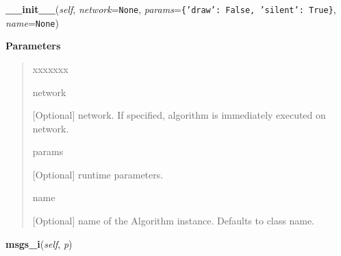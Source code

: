 \hspace{.8\funcindent}\begin{boxedminipage}{\funcwidth}

    \raggedright \textbf{\_\_init\_\_}(\textit{self}, \textit{network}={\tt None}, \textit{params}={\tt \texttt{\{}\texttt{'}\texttt{draw}\texttt{'}\texttt{: }False\texttt{, }\texttt{'}\texttt{silent}\texttt{'}\texttt{: }True\texttt{\}}}, \textit{name}={\tt None})

\setlength{\parskip}{2ex}
\setlength{\parskip}{1ex}
      \textbf{Parameters}
      \vspace{-1ex}

      \begin{quote}
        \begin{Ventry}{xxxxxxx}

          \item[network]

          [Optional] network. If specified, algorithm is immediately 
          executed on network.

          \item[params]

          [Optional] runtime parameters.

          \item[name]

          [Optional] name of the Algorithm instance. Defaults to class 
          name.

        \end{Ventry}

      \end{quote}

    \end{boxedminipage}

    \label{datk:core:distalgs:Algorithm:msgs_i}

    \vspace{0.5ex}

\hspace{.8\funcindent}\begin{boxedminipage}{\funcwidth}

    \raggedright \textbf{msgs\_i}(\textit{self}, \textit{p})

\setlength{\parskip}{2ex}
\setlength{\parskip}{1ex}
    \end{boxedminipage}

